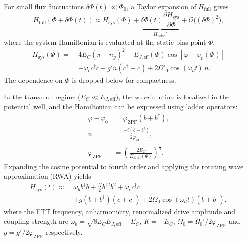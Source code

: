 For small flux fluctuations \(\delta\Phi(t)\ll\Phi_0\), a Taylor expansion of \(H_{\text{full}}\) gives
\begin{equation}
H_{\text{full}}\!\left(\Phi+\delta\Phi(t)\right)
\approx H_{\text{sys}}(\Phi) + \underbrace{\delta\Phi(t)\frac{\partial H_{\text{sys}}}{\partial \Phi}}_{H_{\text{noise}}'} 
+ \mathcal{O}\big((\delta \Phi)^2\big),
\end{equation}
where the system Hamiltonian is evaluated at the static bias point \(\Phi\),
\begin{equation}
\begin{aligned}
\label{system hamiltonian}
H_{\text{sys}}(\Phi) =\; & 4E_C (n-n_g)^2
- E_{J,\mathrm{eff}}(\Phi)
\cos\!\left[{\varphi}-{\varphi_0(\Phi)}\right] \\
& + \omega_c c^{\dagger}c
+ g' n (c^{\dagger}+c)
+ 2\Omega'_0 \cos(\omega_d t)\, n.
\end{aligned}
\end{equation}
The dependence on \(\Phi\) is dropped below for compactness.

In the transmon regime (\(E_C \ll E_{J,\text{eff}}\)), the wavefunction is localized in the potential well, and the Hamiltonian can be expressed using ladder operators:
\begin{equation}
\begin{aligned}
    \varphi - \varphi_0 &= \varphi_{\text{ZPF}} \left( b + b^\dagger \right), \\
    n &= \frac{-i \left( b - b^\dagger \right)}{2 \varphi_{\text{ZPF}}}, \\
    \varphi_{\text{ZPF}} &= \left( \frac{2 E_C}{E_{J,\text{eff}} (\Phi)} \right)^{\frac{1}{4}}.
\end{aligned}
\end{equation}
Expanding the cosine potential to fourth order and applying the rotating wave approximation (RWA) yields
\begin{equation}
\begin{split}
    H_\text{sys}(t) \approx \; & \omega_{b} b^{\dagger} b + \frac{K}{2} b^{\dagger 2} b^{2}+\omega_c c^\dagger c \\
    & + g ( b+ b^{\dagger})( c+ c^{\dagger}) + 2\Omega_0\cos(\omega_{d}t)( b+ b^{\dagger}),
\end{split}
\end{equation}
where the FTT frequency, anharmonicity, renormalized drive amplitude and coupling strength are \(\omega_{b} = \sqrt{8E_{C}E_{J,\text{eff}} } - E_{C}\), \(K = -E_{C}\), \(\Omega_0 = \Omega_0'/2\varphi_{\text{ZPF}}\) and \(g = g'/2\varphi_{\text{ZPF}}\) respectively.

